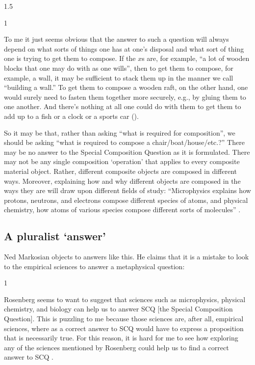 \documentclass[11pt]{article}
\newenvironment{squote}{%
\begin{spacing}{1}
\begin{list}{}{%
    \setlength{\labelwidth}{0pt}%
    \rightmargin\leftmargin%
  }
\item\relax
}{%
\end{list}%
\end{spacing}
}
\begin{document}
\begin{spacing}{1.5}
\begin{squote}
To me it just seems obvious that the answer to such a question will
always depend on what sorts of things one has at one's disposal and
what sort of thing one is trying to get them to compose.  If the $x$s
are, for example, ``a lot of wooden blocks that one may do with as one
wills'', then to get them to compose, for example, a wall, it may be
sufficient to stack them up in the manner we call ``building a wall.''
To get them to compose a wooden raft, on the other hand, one would
surely need to fasten them together more securely, e.g., by gluing
them to one another.  And there's nothing at all one could do with
them to get them to add up to a fish or a clock or a sports car
(\citeyear[705]{rosenberg1993}).
\end{squote}

So it may be that, rather than asking ``what is required for
composition'', we should be asking ``what is required to compose a
chair/boat/house/etc.?''  There may be no answer to the Special
Composition Question as it is formulated.  There may not be any single
composition `operation' that applies to every composite material
object.  Rather, different composite objects are composed in different
ways.  Moreover, explaining how and why different objects are composed
in the ways they are will draw upon different fields of study:
``Microphysics explains how protons, neutrons, and electrons compose
different species of atoms, and physical chemistry, how atoms of
various species compose different sorts of molecules''
\citep[706]{rosenberg1993}.

\subsection{A pluralist `answer'}
\label{pluralist}
Ned Markosian objects to answers like this.  He claims that it is a
mistake to look to the empirical sciences to answer a metaphysical
question:

\begin{squote}
Rosenberg seems to want to suggest that sciences such as microphysics,
physical chemistry, and biology can help us to answer SCQ [the Special
  Composition Question].  This is puzzling to me because those
sciences are, after all, empirical sciences, where as a correct answer
to SCQ would have to express a proposition that is necessarily true.
For this reason, it is hard for me to see how exploring any of the
sciences mentioned by Rosenberg could help us to find a correct answer
to SCQ \citeyearpar[229]{markosian1998a}.
\end{squote}


\end{spacing}
\end{document}
